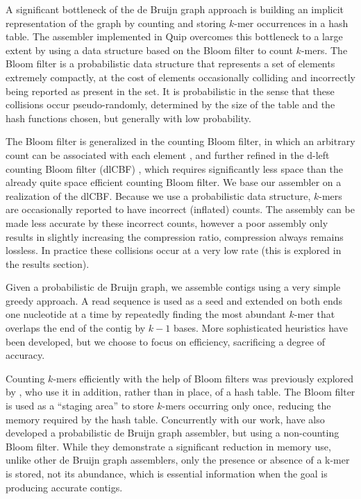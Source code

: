 \documentclass[a4,center,fleqn]{NAR}
\begin{document}
A significant bottleneck of the de Bruijn graph approach is building an
implicit representation of the graph by counting and storing $k$-mer
occurrences in a hash table. The assembler implemented in Quip 
overcomes this bottleneck to a large extent by using a data structure based on
the Bloom filter to count $k$-mers. The Bloom filter \citep{Bloom1970} is a
probabilistic data structure that represents a set of elements extremely
compactly, at the cost of elements occasionally colliding and incorrectly
being reported as present in the set. It is probabilistic in the sense that
these collisions occur pseudo-randomly, determined by the size of the table
and the hash functions chosen, but generally with low probability.

The Bloom filter is generalized in the counting Bloom filter, in which an
arbitrary count can be associated with each element \citep{Fan2000}, and
further refined in the d-left counting Bloom filter (dlCBF)
\citep{Bonomi2006}, which requires significantly less space than the already
quite space efficient counting Bloom filter. We base our assembler on a
realization of the dlCBF. Because we use a probabilistic data structure,
$k$-mers are occasionally reported to have incorrect (inflated) counts. The
assembly can be made less accurate by these incorrect counts, however a poor
assembly only results in slightly increasing the compression ratio,
compression always remains lossless. In practice these collisions occur
at a very low rate (this is explored in the results section).

Given a probabilistic de Bruijn graph, we assemble contigs using a very simple
greedy approach. A read sequence is used as a seed and extended on both ends
one nucleotide at a time by repeatedly finding the most abundant $k$-mer that
overlaps the end of the contig by $k-1$ bases. More sophisticated heuristics
have been developed, but we choose to focus on efficiency, sacrificing a
degree of accuracy.

Counting $k$-mers efficiently with the help of Bloom filters was previously
explored by \citet{Melsted2011}, who use it in addition, rather than
in place, of a hash table. The Bloom filter is used as a ``staging area'' to
store $k$-mers occurring only once, reducing the memory required by the hash
table. Concurrently with our work, \citet{Pell2011} have also developed a
probabilistic de Bruijn graph assembler, but using a non-counting Bloom
filter. While they demonstrate a significant reduction in memory use, unlike
other de Bruijn graph assemblers, only the presence or absence of a k-mer is
stored, not its abundance, which is essential information when the goal is
producing accurate contigs.
\end{document}
